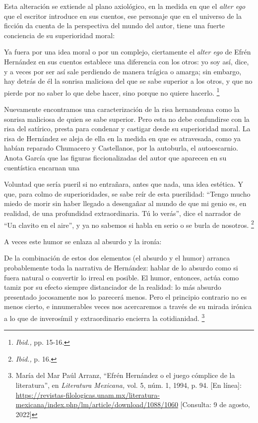 \documentclass[14pt,twoside,final]{extbook} %
\let\oldfootnote\footnote
\renewcommand\footnote[1]{%
\oldfootnote{\hspace{1mm}#1}}
\begin{document}
Esta alteración se extiende al plano axiológico, en la medida en que el \emph{alter ego} que el escritor introduce en sus cuentos, ese personaje que en el universo de la ficción da cuenta de la perspectiva del mundo del autor, tiene una fuerte conciencia de su superioridad moral:
\begin{quoting}
Ya fuera por una idea moral o por un complejo, ciertamente el \emph{alter ego} de Efrén Hernández en sus cuentos establece una diferencia con los otros: yo soy así, dice, y a veces por ser así sale perdiendo de manera trágica o amarga; sin embargo, hay detrás de él la sonrisa maliciosa del que se sabe superior a los otros, y que no pierde por no saber lo que debe hacer, sino porque no quiere hacerlo.\footnote{\emph{Ibid.,} pp. 15-16.}
\end{quoting}
Nuevamente encontramos una caracterización de la risa hernandeana como la sonrisa maliciosa de quien se sabe superior. Pero esta no debe confundirse con la risa del satírico, presta para condenar y castigar desde su superioridad moral. La risa de Hernández se aleja de ella en la medida en que es atravesada, como ya habían reparado Chumacero y Castellanos, por la autoburla, el autoescarnio. Anota García que las figuras ficcionalizadas del autor que aparecen en su cuentística encarnan una
\begin{quoting}
Voluntad que sería pueril si no entrañara, antes que nada, una idea estética. Y que, para colmo de superioridades, se sabe reír de esta puerilidad: ``Tengo mucho miedo de morir sin haber llegado a desengañar al mundo de que mi genio es, en realidad, de una profundidad extraordinaria. Tú lo verás'', dice el narrador de ``Un clavito en el aire'', y ya no sabemos si habla en serio o se burla de nosotros.\footnote{\emph{Ibid.,} p. 16.}
\end{quoting}
A veces este humor se enlaza al absurdo y la ironía:
\begin{quoting}
De la combinación de estos dos elementos (el absurdo y el humor) arranca probablemente toda la narrativa de Hernández: hablar de lo absurdo como si fuera natural o convertir lo irreal en posible. El humor, entonces, actúa como tamiz por su efecto siempre distanciador de la realidad: lo más absurdo presentado jocosamente nos lo parecerá menos. Pero el principio contrario no es menos cierto, e innumerables veces nos acercaremos a través de su mirada irónica a lo que de inverosímil y extraordinario encierra la cotidianidad.\footnote{María del Mar Paúl Arranz, ``Efrén Hernández o el juego cómplice de la literatura'', en \emph{Literatura Mexicana,} vol. 5, núm. 1, 1994, p. 94. [En línea]: \url{https://revistas-filologicas.unam.mx/literatura-mexicana/index.php/lm/article/download/1088/1060} [Consulta: 9 de agosto, 2022]}
\end{quoting}
\end{document}
